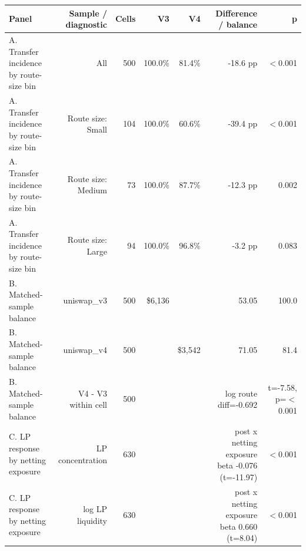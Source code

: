 \begin{tabular}{lrrrrrr}
\toprule
Panel & Sample / diagnostic & Cells & V3 & V4 & Difference / balance & p \\
\midrule
A. Transfer incidence by route-size bin & All & 500 & 100.0\% & 81.4\% & -18.6 pp & \ensuremath{<}0.001 \\
A. Transfer incidence by route-size bin & Route size: Small & 104 & 100.0\% & 60.6\% & -39.4 pp & \ensuremath{<}0.001 \\
A. Transfer incidence by route-size bin & Route size: Medium & 73 & 100.0\% & 87.7\% & -12.3 pp & 0.002 \\
A. Transfer incidence by route-size bin & Route size: Large & 94 & 100.0\% & 96.8\% & -3.2 pp & 0.083 \\
B. Matched-sample balance & uniswap\_v3 & 500 & \$6,136 &  & 53.05 & 100.0 \\
B. Matched-sample balance & uniswap\_v4 & 500 &  & \$3,542 & 71.05 & 81.4 \\
B. Matched-sample balance & V4 - V3 within cell & 500 &  &  & log route diff=-0.692 & t=-7.58, p=\ensuremath{<}0.001 \\
C. LP response by netting exposure & LP concentration & 630 &  &  & post x netting exposure beta -0.076 (t=-11.97) & \ensuremath{<}0.001 \\
C. LP response by netting exposure & log LP liquidity & 630 &  &  & post x netting exposure beta 0.660 (t=8.04) & \ensuremath{<}0.001 \\
\bottomrule
\end{tabular}
